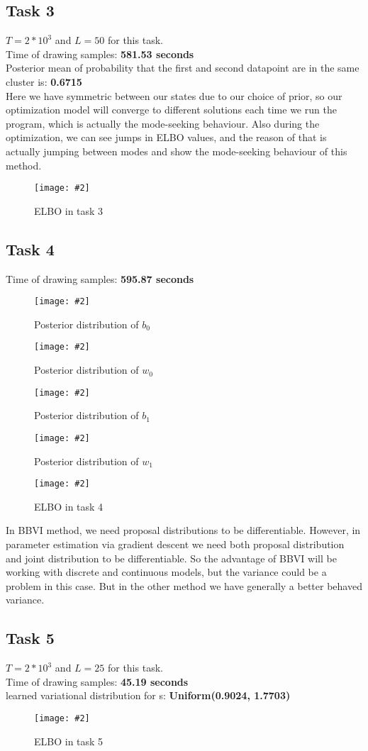 \documentclass{article}
\def\gre#1{{\color{gre}#1}}
\newcommand{\centerfigcap}[3]{\begin{figure}[H]
\begin{center}\texttt{[image: \#2]} \caption{#3}\end{center}
\end{figure}}
\begin{document}
\subsection{Task 3}
$T = 2*10^3$ and $L = 50$ for this task.\\
Time of drawing samples: \textbf{581.53 seconds}\\
Posterior mean of probability that the first and second datapoint are in the same cluster is: \textbf{0.6715}\\
\gre{Here we have symmetric between our states due to our choice of prior, so our optimization model will converge to different solutions each time we run the program,  which is actually the mode-seeking behaviour. Also during the optimization, we can see jumps in ELBO values, and the reason of that is actually jumping between modes and show the mode-seeking behaviour of this method.}
\centerfigcap{0.7}{../figures/ELBO_3}{ELBO in task 3}
\subsection{Task 4}
Time of drawing samples: \textbf{595.87 seconds}\\
\centerfigcap{0.6}{../figures/BBVI_plt_hitmap_program_4_b0}{Posterior distribution of $b_0$}
\centerfigcap{0.6}{../figures/BBVI_plt_hitmap_program_4_w0}{Posterior distribution of $w_0$}
\centerfigcap{0.6}{../figures/BBVI_plt_hitmap_program_4_b1}{Posterior distribution of $b_1$}
\centerfigcap{0.6}{../figures/BBVI_plt_hitmap_program_4_w1}{Posterior distribution of $w_1$}
\centerfigcap{1}{../figures/ELBO_4}{ELBO in task 4}
\gre{In BBVI method, we need proposal distributions to be differentiable.  However, in parameter estimation via gradient descent we need both proposal distribution and joint distribution to be differentiable.  So the advantage of BBVI will be working with discrete and continuous models, but the variance could be a problem in this case.  But in the other method we have generally a better behaved variance.}


\subsection{Task 5}
$T = 2*10^3$ and $L = 25$ for this task.\\
Time of drawing samples: \textbf{45.19 seconds}\\
learned variational distribution for s: \textbf{Uniform(0.9024, 1.7703)} 
\centerfigcap{1}{../figures/ELBO_5}{ELBO in task 5}
\end{document}
